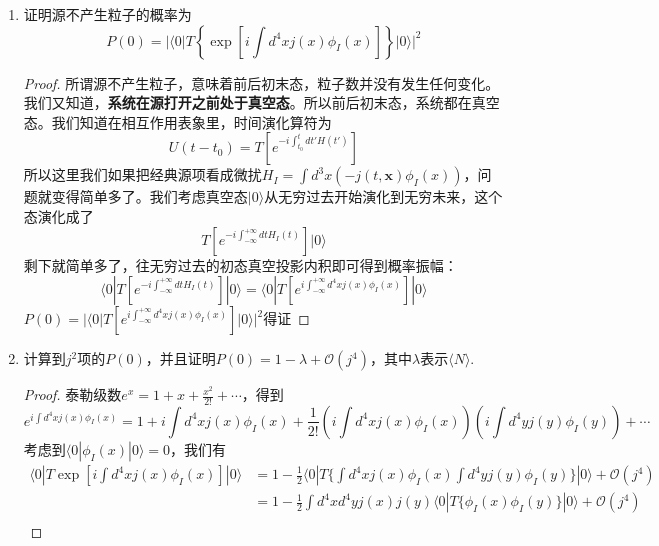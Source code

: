 \documentclass[a4paper]{article}
\newtheorem{proof}{答案}[section]
\begin{document}
\begin{enumerate}
    \item 证明源不产生粒子的概率为
    \begin{equation}
        P(0)=|\langle 0|T\left\{\exp[i\int d^4xj(x)\phi_I(x)]\right\}|0\rangle|^2
    \end{equation}
    \begin{proof}
        所谓源不产生粒子，意味着前后初末态，粒子数并没有发生任何变化。我们又知道，\textbf{系统在源打开之前处于真空态}。所以前后初末态，系统都在真空态。我们知道在相互作用表象里，时间演化算符为
        \begin{equation}
            U(t-t_0)=T[e^{-i\int_{t_0}^t dt' H(t')}]
        \end{equation}
        所以这里我们如果把经典源项看成微扰$H_I=\int d^3x(-j(t,\mathbf{x})\phi_I(x))$，问题就变得简单多了。我们考虑真空态$|0\rangle$从无穷过去开始演化到无穷未来，这个态演化成了
        \begin{equation}
            T[e^{-i\int_{-\infty}^{+\infty} dt H_I(t)}]|0\rangle
        \end{equation}
        剩下就简单多了，往无穷过去的初态真空投影内积即可得到概率振幅：
        \begin{equation}
            \langle 0|T[e^{-i\int_{-\infty}^{+\infty} dt H_I(t)}]|0\rangle=\langle 0|T[e^{i\int_{-\infty}^{+\infty} d^4 x j(x)\phi_I(x)}]|0\rangle
        \end{equation}
        $P(0)=|\langle 0|T[e^{i\int_{-\infty}^{+\infty} d^4 x j(x)\phi_I(x)}]|0\rangle|^2$得证
    \end{proof}
    \item 计算到$j^2$项的$P(0)$，并且证明$P(0)=1-\lambda+\mathcal{O}(j^4)$，其中$\lambda$表示$\langle N\rangle$.
    \begin{proof}
        泰勒级数$e^x=1+x+\frac{x^2}{2!}+\cdots$，得到
        \begin{equation}
            e^{i\int d^4x j(x)\phi_I(x)}=1+i\int d^4 x j(x)\phi_I(x)+\frac{1}{2!}\left(i\int d^4 xj(x)\phi_I(x)\right)\left(i\int d^4 yj(y)\phi_I(y)\right)+\cdots
        \end{equation}
        考虑到$\langle 0|\phi_I(x)|0\rangle=0$，我们有
        \begin{equation}
            \begin{split}
                \langle 0|T\exp[i\int d^4x j(x)\phi_I(x)]|0\rangle&=1-\frac{1}{2}\langle 0|T\{\int d^4xj(x)\phi_I(x)\int d^4y j(y)\phi_I(y)\}|0\rangle+\mathcal{O}(j^4)\\
                &=1-\frac{1}{2}\int d^4xd^4yj(x)j(y)\langle 0|T\{\phi_I(x)\phi_I(y)\}|0\rangle+\mathcal{O}(j^4)\\

\end{split}
\end{equation}
\end{proof}
\end{enumerate}
\end{document}
